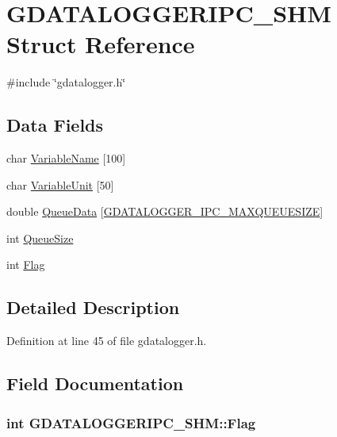 \hypertarget{structGDATALOGGERIPC__SHM}{\section{G\-D\-A\-T\-A\-L\-O\-G\-G\-E\-R\-I\-P\-C\-\_\-\-S\-H\-M Struct Reference}
\label{structGDATALOGGERIPC__SHM}
}


{\ttfamily \#include \char`\"{}gdatalogger.\-h\char`\"{}}

\subsection*{Data Fields}
\begin{DoxyCompactItemize}
\item 
char \hyperlink{structGDATALOGGERIPC__SHM_afb130e15f688a18e52e2037f4bb17e89}{Variable\-Name} \mbox{[}100\mbox{]}
\item 
char \hyperlink{structGDATALOGGERIPC__SHM_a8efd7b2ed8ff087f9694cb47a8c25a13}{Variable\-Unit} \mbox{[}50\mbox{]}
\item 
double \hyperlink{structGDATALOGGERIPC__SHM_ac495752de142e6697c08f713505ed55c}{Queue\-Data} \mbox{[}\hyperlink{gdatalogger_8h_a00f4336631a938f844b41833ca088ca2}{G\-D\-A\-T\-A\-L\-O\-G\-G\-E\-R\-\_\-\-I\-P\-C\-\_\-\-M\-A\-X\-Q\-U\-E\-U\-E\-S\-I\-Z\-E}\mbox{]}
\item 
int \hyperlink{structGDATALOGGERIPC__SHM_a7d392777d231e1b0cece66cb51b0945b}{Queue\-Size}
\item 
int \hyperlink{structGDATALOGGERIPC__SHM_a346eca077a97246740a6ed4f7c08833c}{Flag}
\end{DoxyCompactItemize}


\subsection{Detailed Description}


Definition at line 45 of file gdatalogger.\-h.



\subsection{Field Documentation}
\hypertarget{structGDATALOGGERIPC__SHM_a346eca077a97246740a6ed4f7c08833c}{
\subsubsection[{Flag}]{\setlength{\rightskip}{0pt plus 5cm}int G\-D\-A\-T\-A\-L\-O\-G\-G\-E\-R\-I\-P\-C\-\_\-\-S\-H\-M\-::\-Flag}}\label{structGDATALOGGERIPC__SHM_a346eca077a97246740a6ed4f7c08833c}


